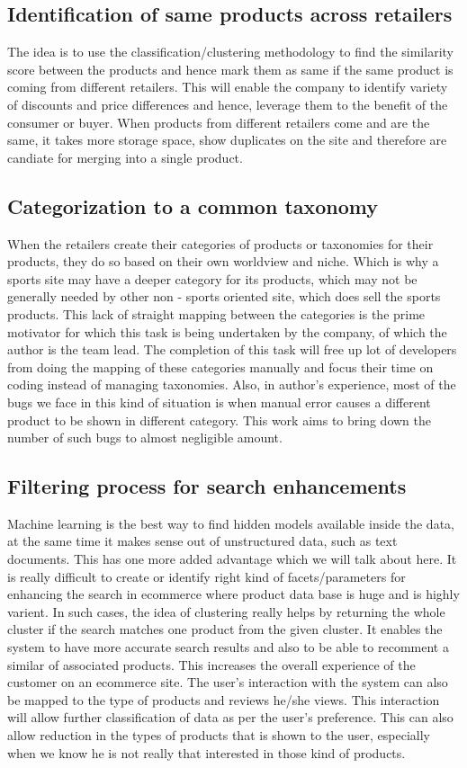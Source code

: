 \documentclass[12pt]{book}
\begin{document}
\subsection{Identification of same products across retailers}
The idea is to use the classification/clustering methodology to find the similarity score between the products and hence mark them as same if the same product is coming from different retailers. This will enable the company to identify variety of
discounts and price differences and hence, leverage them to the benefit of the consumer or buyer. When products from different retailers come and are the same, it takes more storage space, show duplicates on the site and therefore are candiate for 
merging into a single product.

\subsection{Categorization to a common taxonomy}
When the retailers create their categories of products or taxonomies for their products, they do so based on their own worldview and niche. Which is why a sports site may have a deeper category for its products, which may not be generally needed by
other non - sports oriented site, which does sell the sports products. This lack of straight mapping between the categories is the prime motivator for which this task is being undertaken by the company, of which the author is the team lead. The 
completion of this task will free up lot of developers from doing the mapping of these categories manually and focus their time on coding instead of managing taxonomies. Also, in author's experience, most of the bugs we face in this kind of situation 
is when manual error causes a different product to be shown in different category. This work aims to bring down the number of such bugs to almost negligible amount.

\subsection{Filtering process for search enhancements}
Machine learning is the best way to find hidden models available inside the data, at the same time it makes sense out of unstructured data, such as text documents. This has one more added advantage which we will talk about here. It is really difficult 
to create or identify right kind of facets/parameters for enhancing the search in ecommerce where product data base is huge and is highly varient. In such cases, the idea of clustering really helps by returning the whole cluster if the search matches one
product from the given cluster. It enables the system to have more accurate search results and also to be able to recomment a similar of associated products. This increases the overall experience of the customer on an ecommerce site. The user's interaction
with the system can also be mapped to the type of products and reviews he/she views. This interaction will allow further classification of data as per the user's preference. This can also allow reduction in the types of products that is shown to the user,
especially when we know he is not really that interested in those kind of products.
\end{document}
